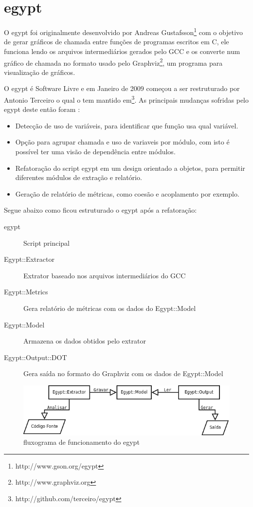 \section{egypt}

O egypt foi originalmente desenvolvido por Andreas
Gustafsson\footnote{http://www.gson.org/egypt} com o objetivo de gerar gráficos
de chamada entre funções de programas escritos em C, ele funciona lendo os
arquivos intermediários gerados pelo GCC e os
converte num gráfico de chamada no formato usado pelo
Graphviz\footnote{http://www.graphviz.org}, um programa para visualização de
gráficos.

O egypt é Software Livre e em Janeiro de 2009 começou a ser restruturado por
Antonio Terceiro o qual o tem mantido
em\footnote{http://github.com/terceiro/egypt}. As principais mudanças sofridas
pelo egypt deste então foram \cite{structuralComplexityEvolution}:

\begin{itemize}
\item Detecção de uso de variáveis, para identificar que função usa qual
variável.
\item Opção para agrupar chamada e uso de variaveis por módulo, com isto é
possível ter uma visão de dependência entre módulos.
\item Refatoração do script egypt em um design orientado a objetos, para
permitir diferentes módulos de extração e relatório.
\item Geração de relatório de métricas, como coesão e acoplamento por exemplo.
\end{itemize}

Segue abaixo como ficou estruturado o egypt após a refatoração:

\begin{description}
\item[egypt] Script principal
\item[Egypt::Extractor] Extrator baseado nos arquivos intermediários do GCC
\item[Egypt::Metrics] Gera relatório de métricas com os dados do Egypt::Model
\item[Egypt::Model] Armazena os dados obtidos pelo extrator
\item[Egypt::Output::DOT] Gera saída no formato do Graphviz com os dados de Egypt::Model
\end{description}

\begin{figure}[h]
\center
\includegraphics[scale=0.4]{imagens/egypt-fluxogram}
\caption{fluxograma de funcionamento do egypt}
\label{egypt-fluxogram}
\end{figure}

